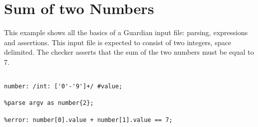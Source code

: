
\section{Sum of two Numbers}
{
	This example shows all the basics of a Guardian input
	file: parsing, expressions and assertions.
	This input file is expected to consist of two integers, space delimited.
	The checker asserts that the sum of the two numbers must be equal to 7.
	
\begin{lstlisting}[texcl=true, language=MAIA]
%skip: ' ';

number: /int: ['0'-'9']+/ #value;

%parse argv as number{2};

%error: number[0].value + number[1].value == 7;
\end{lstlisting}
}

